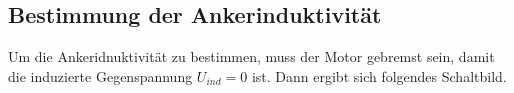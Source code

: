 \subsection{Bestimmung der Ankerinduktivität}

Um die Ankeridnuktivität zu bestimmen, muss der Motor gebremst sein,
damit die induzierte Gegenspannung $U_{ind} = 0$ ist. Dann ergibt sich
folgendes Schaltbild.





